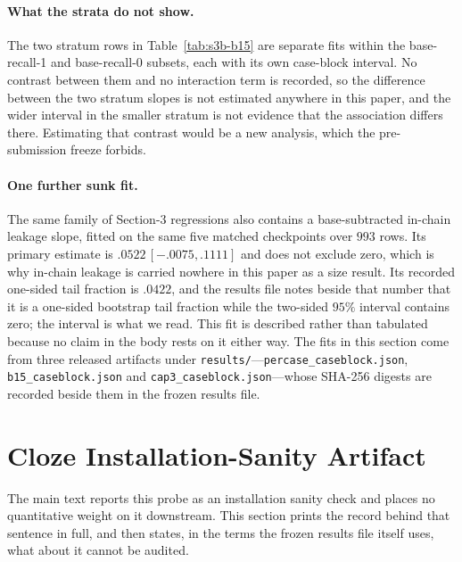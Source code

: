 \documentclass[letterpaper]{article}
\begin{document}
\paragraph{What the strata do not show.}  The two stratum rows in
Table~\ref{tab:s3b-b15} are separate fits within the base-recall-1 and
base-recall-0 subsets, each with its own case-block interval.  No contrast
between them and no interaction term is recorded, so the difference between the
two stratum slopes is not estimated anywhere in this paper, and the wider
interval in the smaller stratum is not evidence that the association differs
there.  Estimating that contrast would be a new analysis, which the
pre-submission freeze forbids.

\paragraph{One further sunk fit.}  The same family of Section-3 regressions also
contains a base-subtracted in-chain leakage slope, fitted on the same five
matched checkpoints over \(993\) rows.  Its primary estimate is
\(.0522\,[-.0075, .1111]\) and does not exclude zero, which is why in-chain
leakage is carried nowhere in this paper as a size result.  Its recorded
one-sided tail fraction is \(.0422\), and the results file notes beside that
number that it is a one-sided bootstrap tail fraction while the two-sided
\(95\%\) interval contains zero; the interval is what we read.  This fit is
described rather than tabulated because no claim in the body rests on it either
way.  The fits in this section come from three released artifacts under
\texttt{results/}---\texttt{percase\_\allowbreak caseblock.json},
\texttt{b15\_\allowbreak caseblock.json} and
\texttt{cap3\_\allowbreak caseblock.json}---whose SHA-256 digests are recorded
beside them in the frozen results file.

\section{Cloze Installation-Sanity Artifact}
The main text reports this probe as an installation sanity check and places no
quantitative weight on it downstream.  This section prints the record behind
that sentence in full, and then states, in the terms the frozen results file
itself uses, what about it cannot be audited.
\end{document}
